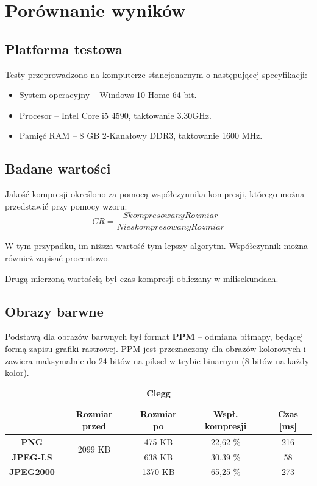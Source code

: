\section{Porównanie wyników}

\subsection{Platforma testowa}

Testy przeprowadzono na komputerze stancjonarnym o następującej specyfikacji:

\begin{itemize}
	\item System operacyjny -- Windows 10 Home 64-bit.
	\item Procesor -- Intel Core i5 4590, taktowanie 3.30GHz.
	\item Pamięć RAM -- 8 GB 2-Kanałowy DDR3, taktowanie 1600 MHz.
\end{itemize}

\subsection{Badane wartości}

Jakość kompresji określono za pomocą współczynnika kompresji, którego można przedstawić przy pomocy wzoru:
\[
CR = \frac{ Skompresowany Rozmiar }{ Nieskompresowany Rozmiar } 
\]

W tym przypadku, im niższa wartość tym lepszy algorytm. Współczynnik można również zapisać procentowo.

Drugą mierzoną wartością był czas kompresji obliczany w milisekundach.

\subsection{Obrazy barwne}

Podstawą dla obrazów barwnych był format \textbf{PPM} -- odmiana bitmapy, będącej formą zapisu grafiki rastrowej. PPM jest przeznaczony dla obrazów kolorowych i zawiera maksymalnie do 24 bitów na piksel w trybie binarnym (8 bitów na każdy kolor).

\begin{table}[!h]
	\centering
	\caption{\textbf{Clegg}}
	\label{my-label}
	\begin{tabular}{|c|c|c|c|c|}                                             
		\hline
		& \textbf{Rozmiar przed} & \textbf{Rozmiar po} & \textbf{Wspł. kompresji} & \textbf{Czas {[}ms{]}} \\ \hline 
		\textbf{PNG}      &          \multicolumn{1}{c|}{\multirow{2}{*}{2099 KB}}             &      475 KB               &         22,62 \%                 &              216               \\\cline{3-5}
		\textbf{JPEG-LS}  &                        &        638  KB         &      30,39 \%                  &         58                 \\\cline{3-5}
		\textbf{JPEG2000} &                        &        1370 KB             &       65,25 \%                   &        273              \\ \hline
	\end{tabular}
\end{table}

